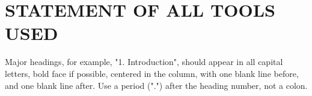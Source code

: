 \documentclass{article}
\begin{document}
\section{STATEMENT OF ALL TOOLS USED}
\label{sec:statementofalltoolsused}

Major headings, \cite{Lamp86} for example, "1. Introduction", should appear in all capital
letters, bold face if possible, centered in the column, with one blank line
before, and one blank line after. Use a period (".") after the heading number,
not a colon.


\vfill\pagebreak



\end{document}
